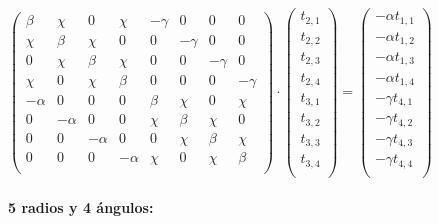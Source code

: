\documentclass[12pt]{article}
\newcommand{\Gpmatrix}[1]{\ensuremath{\begin{pmatrix} #1 \end{pmatrix}}}
\newcommand{\sub}[3]{\ensuremath{#1_{#2,#3}}}
\begin{document}
\(
\Gpmatrix{
  \beta & \chi & 0 & \chi & -\gamma & 0 & 0 & 0 \\
  \chi & \beta & \chi & 0 & 0 & -\gamma & 0 & 0 \\
  0 & \chi & \beta & \chi & 0 & 0 & -\gamma & 0 \\
  \chi & 0 & \chi & \beta & 0 & 0 & 0 & -\gamma \\
  -\alpha & 0 & 0 & 0 & \beta & \chi & 0 & \chi \\
  0 & -\alpha & 0 & 0 & \chi & \beta & \chi & 0 \\
  0 & 0 & -\alpha & 0 & 0 & \chi & \beta & \chi \\
  0 & 0 & 0 & -\alpha & \chi & 0 & \chi & \beta \\
} \cdot \Gpmatrix{
  \sub{t}{2}{1} \\
  \sub{t}{2}{2} \\
  \sub{t}{2}{3} \\
  \sub{t}{2}{4} \\
  \sub{t}{3}{1} \\
  \sub{t}{3}{2} \\
  \sub{t}{3}{3} \\
  \sub{t}{3}{4} \\
} = \Gpmatrix{
  -\alpha\sub{t}{1}{1} \\
  -\alpha\sub{t}{1}{2} \\
  -\alpha\sub{t}{1}{3} \\
  -\alpha\sub{t}{1}{4} \\
  -\gamma\sub{t}{4}{1} \\
  -\gamma\sub{t}{4}{2} \\
  -\gamma\sub{t}{4}{3} \\
  -\gamma\sub{t}{4}{4} \\
}
\)

\paragraph{5 radios y 4 ángulos:} \ \\
\end{document}
